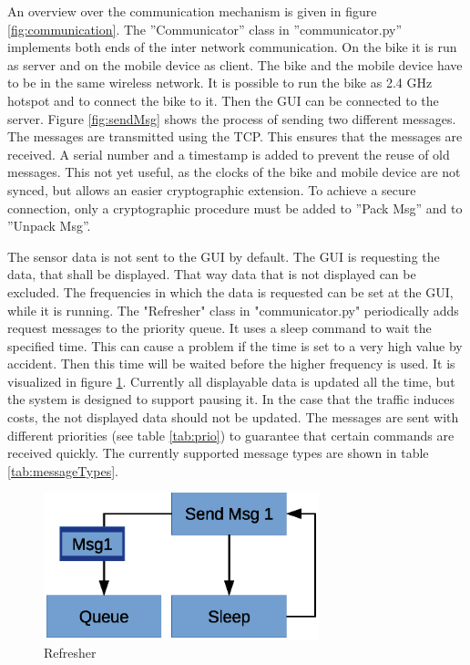 \documentclass[]{scrreprt}
\begin{document}
	An overview over the communication mechanism is given in figure \ref{fig:communication}. The ''Communicator'' class in ''communicator.py'' implements both ends of the inter network communication. On the bike it is run as server and on the mobile device as client. The bike and the mobile device have to be in the same wireless network. It is possible to run the bike as 2.4 GHz hotspot and to connect the bike to it. Then the GUI can be connected to the server. Figure \ref{fig:sendMsg} shows the process of sending two different messages. The messages are transmitted using the TCP. This ensures that the messages are received. A serial number and a timestamp is added to prevent the reuse of old messages. This not yet useful, as the clocks of the bike and mobile device are not synced, but allows an easier cryptographic extension. To achieve a secure connection, only a cryptographic procedure must be added to ''Pack Msg'' and to ''Unpack Msg''.
	
	The sensor data is not sent to the GUI by default. The GUI is requesting the data, that shall be displayed. That way data that is not displayed can be excluded. The frequencies in which the data is requested can be set at the GUI, while it is running. The "Refresher" class in "communicator.py" periodically adds request messages to the priority queue. It uses a sleep command to wait the specified time. This can cause a problem if the time is set to a very high value by accident. Then this time will be waited before the higher frequency is used. It is visualized in figure \ref{fig:refresher}. Currently all displayable data is updated all the time, but the system is designed to support pausing it. In the case that the traffic induces costs, the not displayed data should not be updated. The messages are sent with different priorities (see table \ref{tab:prio}) to guarantee that certain commands are received quickly. The currently supported message types are shown in table \ref{tab:messageTypes}.
	\begin{figure}
		\centering
		\includegraphics[width=8cm]{images/refresher.eps}
		\caption{Refresher} \label{fig:refresher}
	\end{figure}
	
\end{document}
